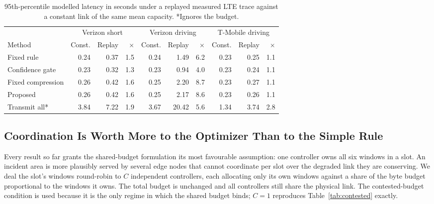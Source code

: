 \documentclass[conference,a4paper]{IEEEtran}
\newif\ifsubmission
\newcommand{\masteronly}[1]{\ifsubmission\else#1\fi}
\begin{document}
\masteronly{%
\begin{table}[t]
\caption{95th-percentile modelled latency in seconds under a replayed measured LTE trace against a constant link of the same mean capacity. *Ignores the budget.}
\label{tab:trace}
\centering\scriptsize
\setlength{\tabcolsep}{4pt}
\begin{tabular}{@{}lrrrrrrrrr@{}}
\toprule
 & \multicolumn{3}{c}{Verizon short} & \multicolumn{3}{c}{Verizon driving} & \multicolumn{3}{c}{T-Mobile driving} \\
\cmidrule(lr){2-4}\cmidrule(lr){5-7}\cmidrule(lr){8-10}
Method & Const. & Replay & $\times$ & Const. & Replay & $\times$ & Const. & Replay & $\times$ \\
\midrule
Fixed rule & 0.24 & 0.37 & 1.5 & 0.24 & 1.49 & 6.2 & 0.23 & 0.25 & 1.1 \\
Confidence gate & 0.23 & 0.32 & 1.3 & 0.23 & 0.94 & 4.0 & 0.23 & 0.24 & 1.1 \\
Fixed compression & 0.26 & 0.42 & 1.6 & 0.25 & 2.20 & 8.7 & 0.23 & 0.27 & 1.1 \\
Proposed & 0.26 & 0.42 & 1.6 & 0.25 & 2.17 & 8.6 & 0.23 & 0.26 & 1.1 \\
Transmit all* & 3.84 & 7.22 & 1.9 & 3.67 & 20.42 & 5.6 & 1.34 & 3.74 & 2.8 \\
\bottomrule
\end{tabular}
\end{table}}%


\subsection{Coordination Is Worth More to the Optimizer Than to the Simple Rule}
\label{sec:coord}
Every result so far grants the shared-budget formulation its most favourable assumption: one controller owns all six windows in a slot. An incident area is more plausibly served by several edge nodes that cannot coordinate per slot over the degraded link they are conserving. We deal the slot's windows round-robin to $C$ independent controllers, each allocating only its own windows against a share of the byte budget proportional to the windows it owns. The total budget is unchanged and all controllers still share the physical link. The contested-budget condition is used because it is the only regime in which the shared budget binds; $C=1$ reproduces Table~\ref{tab:contested} exactly.
\end{document}
